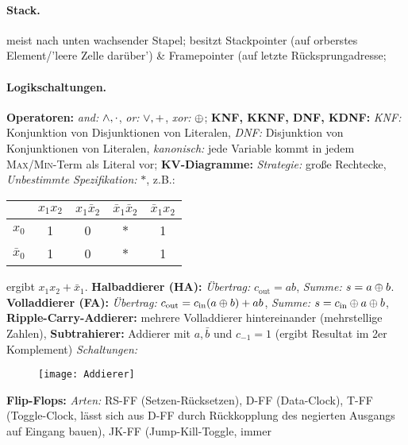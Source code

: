\documentclass[8pt,a4paper]{article}
\begin{document}
\begin{multicols}{2}
\paragraph{Stack.} meist nach unten wachsender Stapel; besitzt Stackpointer (auf orberstes Element/'leere Zelle darüber') \& Framepointer (auf letzte Rücksprungadresse;

\paragraph{Logikschaltungen.} \textbf{Operatoren:} \emph{and:}
$\wedge,\cdot$, \emph{or:} $\vee,+$, \emph{xor:} $\oplus$; \textbf{KNF, KKNF, DNF, KDNF:}
\emph{KNF:} Konjunktion von Disjunktionen von
Literalen, \emph{DNF:} Disjunktion von Konjunktionen von Literalen,
\emph{kanonisch:} jede Variable kommt in jedem \textsc{Max/Min}-Term
als Literal vor; \textbf{KV-Diagramme:} \emph{Strategie:} große
Rechtecke, \emph{Unbestimmte Spezifikation:} $*$, z.B.:                                                      \\
\begin{tabular}{c|cccc}
            & $x_1x_2$ & $x_1\bar{x}_2$ & $ \bar{x}_1\bar{x}_2$ & 
 $\bar{x}_1x_2$                                                                                              \\ \hline
$x_0$       & 1        & 0              & $*$                   & 1                                          \\
$\bar{x}_0$ & 1        & 0              & $*$                   & 1                                          \\  
\end{tabular} ergibt $x_1x_2+\bar{x}_1$.
\textbf{Halbaddierer (HA):} \emph{Übertrag:} $c_{\text{out}}=ab$,
\emph{Summe:} $s=a\oplus b$. \textbf{Volladdierer (FA):}
\emph{Übertrag:} $c_{\text{out}}=c_{\text{in}}(a\oplus b)+ab$, \emph{Summe:}
$s=c_{\text{in}}\oplus a\oplus b$, \textbf{Ripple-Carry-Addierer:}
mehrere Volladdierer hintereinander (mehrstellige Zahlen),
\textbf{Subtrahierer:} Addierer mit $a,\bar{b}$ und $c_{-1}=1$ (ergibt
Resultat im 2er Komplement) \emph{Schaltungen:}
\begin{figure}[H]
  \centering
  \texttt{[image: Addierer]}
\end{figure}
%
\textbf{Flip-Flops:} \emph{Arten:} RS-FF (Setzen-Rücksetzen), D-FF
(Data-Clock), T-FF (Toggle-Clock, lässt sich aus D-FF durch
Rückkopplung des negierten Ausgangs auf Eingang bauen), JK-FF (Jump-Kill-Toggle, immer

\end{multicols}
\end{document}
